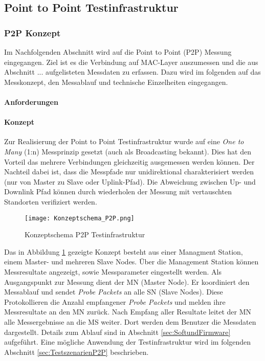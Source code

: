 \vspace*{4cm}
\begin{center}
\part{Point to Point Testinfrastruktur}\label{PointtoPointTestinfrastruktur}
\end{center}
\vspace*{\fill}
\clearpage

\section{P2P Konzept}\label{sec:P2PKonzept}

Im Nachfolgenden Abschnitt wird auf die Point to Point (P2P) Messung eingegangen. Ziel ist es die Verbindung auf MAC-Layer auszumessen und die aus Abschnitt ... aufgelisteten Messdaten zu erfassen. Dazu wird im folgenden auf das Messkonzept, den Messablauf und technische Einzelheiten eingegangen. 

\subsection{Anforderungen}\label{sec:AnforderungentP2P}


\subsection{Konzept}\label{sec:KonzeptP2P}

Zur Realisierung der Point to Point Testinfrastruktur wurde auf eine \textit{One to Many} (1:n) Messprinzip gesetzt (auch als Broadcasting bekannt). Dies hat den Vorteil das mehrere Verbindungen gleichzeitig ausgemessen werden können. Der Nachteil dabei ist, dass die Messpfade nur unidirektional charakterisiert werden (nur von Master zu Slave oder Uplink-Pfad). Die Abweichung zwischen Up- und Downlink Pfad können durch wiederholen der Messung mit vertauschten Standorten verifiziert werden. 

\begin{figure} [H]
	\centering
	\texttt{[image: Konzeptschema\_P2P.png]}
	\caption{Konzeptschema P2P Testinfrastruktur}
	\label{fig:KonzeptschemaP2P}
\end{figure}

Das in Abbildung \ref{fig:KonzeptschemaP2P} gezeigte Konzept besteht aus einer Managment Station, einem Master- und mehreren Slave Nodes. Über die Management Station können Messresultate angezeigt, sowie Messparameter eingestellt werden. Als Ausgangspunkt zur Messung dient der MN (Master Node). Er koordiniert den Messablauf und sendet \textit{Probe Packets} an alle SN (Slave Nodes). Diese Protokollieren die Anzahl empfangener \textit{Probe Packets} und melden ihre Messresultate an den MN zurück. Nach Empfang aller Resultate leitet der MN alle Messergebnisse an die MS weiter. Dort werden dem Benutzer die Messdaten dargestellt. Details zum Ablauf sind in Abschnitt \ref{sec:SoftundFirmware} aufgeführt. Eine mögliche Anwendung der Testinfrastruktur wird im folgenden Abschnitt \ref{sec:TestszenarienP2P} beschrieben.  

